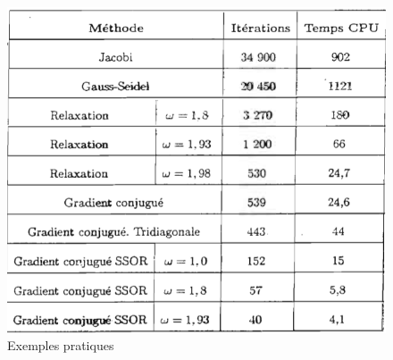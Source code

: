 \begin{figure}[h]
    \centering
    \includegraphics[scale=0.5]{tableau.png}
    \caption{Exemples pratiques}
    \label{fig:tableau}
\end{figure}

